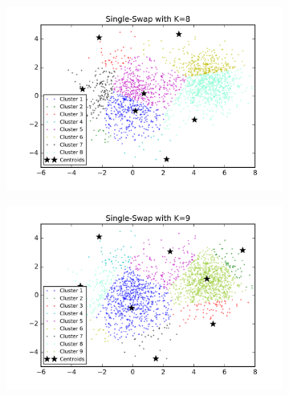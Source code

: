 \begin{figure}[htb]
\begin{subfigure}[b]{0.475\textwidth}
        \end{subfigure}
        \hfill
        \begin{subfigure}[b]{0.475\textwidth}  
            \centering 
            \includegraphics[width=\textwidth]{./figures/clustering_singleSwap_8.png}
        \end{subfigure}
        \begin{subfigure}[b]{0.475\textwidth}   
            \centering 
            \includegraphics[width=\textwidth]{./figures/clustering_singleSwap_9.png}
        \end{subfigure}
        \hfill
        \begin{subfigure}[b]{0.475\textwidth}   
            \centering 

\end{subfigure}
\end{figure}
